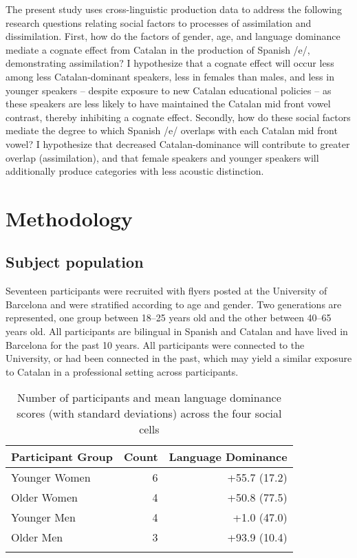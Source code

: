 \documentclass[output=paper,colorlinks,citecolor=brown,draftmode]{langscibook}
\begin{document}
The present study uses cross-linguistic production data to address the following research questions relating social factors to processes of assimilation and dissimilation. First, how do the factors of gender, age, and language dominance mediate a cognate effect from Catalan in the production of Spanish /e/, demonstrating assimilation? I hypothesize that a cognate effect will occur less among less Catalan-dominant speakers, less in females than males, and less in younger speakers -- despite exposure to new Catalan educational policies -- as these speakers are less likely to have maintained the Catalan mid front vowel contrast, thereby inhibiting a cognate effect. Secondly, how do these social factors mediate the degree to which Spanish /e/ overlaps with each Catalan mid front vowel? I hypothesize that decreased Catalan-dominance will contribute to greater overlap (assimilation), and that female speakers and younger speakers will additionally produce categories with less acoustic distinction.

\section{Methodology}

\subsection{Subject population}
    Seventeen participants were recruited with flyers posted at the University of Barcelona and were stratified according to age and gender. Two generations are represented, one group between 18--25 years old and the other between 40--65 years old. All participants are bilingual in Spanish and Catalan and have lived in Barcelona for the past 10 years. All participants were connected to the University, or had been connected in the past, which may yield a similar exposure to Catalan in a professional setting across participants.
    \begin{table}
        \centering
        \begin{tabular}{lrr}
        \lsptoprule
        Participant Group & Count & Language Dominance\\
        \midrule
        Younger Women & 6 & +55.7 (17.2)\\
        Older Women & 4 & +50.8 (77.5)\\
        Younger Men & 4 & +1.0 (47.0)\\
        Older Men & 3 & +93.9 (10.4)\\
        \lspbottomrule
        \end{tabular}
        \caption{Number of participants and mean language dominance scores (with standard deviations) across the four social cells}
        \label{tab:participants}
    \end{table}
\end{document}
